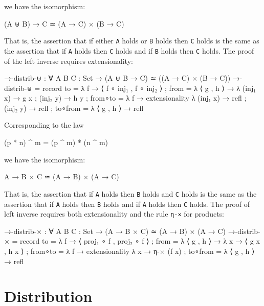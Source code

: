 we have the isomorphism:

\begin{myDisplay}
(A ⊎ B) → C  ≃  (A → C) × (B → C)
\end{myDisplay}

That is, the assertion that if either \texttt{A} holds or \texttt{B}
holds then \texttt{C} holds is the same as the assertion that if
\texttt{A} holds then \texttt{C} holds and if \texttt{B} holds then
\texttt{C} holds. The proof of the left inverse requires extensionality:

\begin{fence}
\begin{code}
→-distrib-⊎ : ∀ {A B C : Set} → (A ⊎ B → C) ≃ ((A → C) × (B → C))
→-distrib-⊎ =
  record
    { to      = λ{ f → ⟨ f ∘ inj₁ , f ∘ inj₂ ⟩ }
    ; from    = λ{ ⟨ g , h ⟩ → λ{ (inj₁ x) → g x ; (inj₂ y) → h y } }
    ; from∘to = λ{ f → extensionality λ{ (inj₁ x) → refl ; (inj₂ y) → refl } }
    ; to∘from = λ{ ⟨ g , h ⟩ → refl }
    }
\end{code}
\end{fence}

Corresponding to the law

\begin{myDisplay}
(p * n) ^ m = (p ^ m) * (n ^ m)
\end{myDisplay}

we have the isomorphism:

\begin{myDisplay}
A → B × C  ≃  (A → B) × (A → C)
\end{myDisplay}

That is, the assertion that if \texttt{A} holds then \texttt{B} holds
and \texttt{C} holds is the same as the assertion that if \texttt{A}
holds then \texttt{B} holds and if \texttt{A} holds then \texttt{C}
holds. The proof of left inverse requires both extensionality and the
rule \texttt{η-×} for products:

\begin{fence}
\begin{code}
→-distrib-× : ∀ {A B C : Set} → (A → B × C) ≃ (A → B) × (A → C)
→-distrib-× =
  record
    { to      = λ{ f → ⟨ proj₁ ∘ f , proj₂ ∘ f ⟩ }
    ; from    = λ{ ⟨ g , h ⟩ → λ x → ⟨ g x , h x ⟩ }
    ; from∘to = λ{ f → extensionality λ{ x → η-× (f x) } }
    ; to∘from = λ{ ⟨ g , h ⟩ → refl }
    }
\end{code}
\end{fence}

\hypertarget{distribution}{%
\section{Distribution}\label{distribution}}

